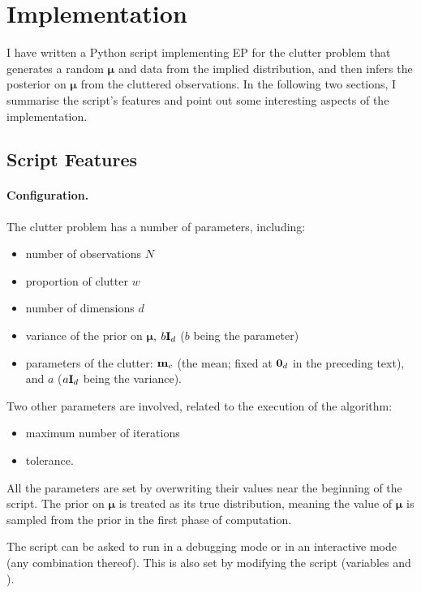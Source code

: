 \documentclass[11pt]{article}
\begin{document}
\section{Implementation}
\label{sec:impl}

I have written a Python script implementing EP for the clutter problem 
that generates a random $\boldsymbol{\mu}$ and data from the implied 
distribution, and then infers the posterior on $\boldsymbol{\mu}$ from 
the cluttered observations. In the following two sections, I summarise the 
script's features and point out some interesting aspects of the 
implementation.

\subsection*{Script Features}

\paragraph{Configuration.} The clutter problem has a number of parameters, 
including:
\begin{itemize}
	\item number of observations $N$
	\item proportion of clutter $w$
	\item number of dimensions $d$
	\item variance of the prior on $\boldsymbol{\mu}$, $b\mathbf{I}_d$ ($b$ being 
		the parameter)
	\item parameters of the clutter:
		$\mathbf{m}_c$ (the mean; fixed at $\mathbf{0}_d$ in the preceding text),
		and $a$ ($a\mathbf{I}_d$ being the variance).
\end{itemize}
Two other parameters are involved, related to the execution of the 
algorithm:
\begin{itemize}
	\item maximum number of iterations
	\item tolerance.
\end{itemize}

All the parameters are set by overwriting their values near the beginning 
of the script. The prior on $\boldsymbol{\mu}$ is treated as its true 
distribution, meaning the value of $\boldsymbol{\mu}$ is sampled from the 
prior in the first phase of computation.

The script can be asked to run in a debugging mode or in an interactive 
mode (any combination thereof). This is also set by modifying the script 
(variables  and ).
\end{document}
